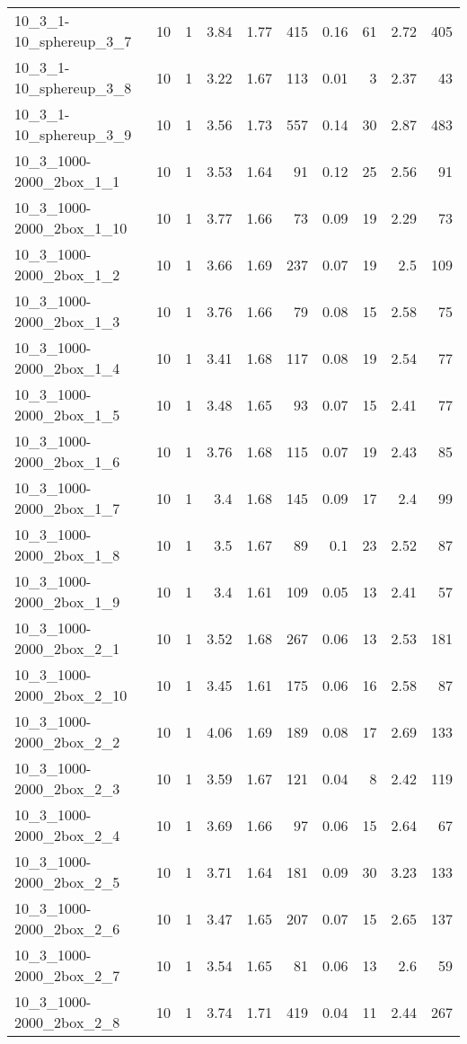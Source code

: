 \begin{center}
\begin{scriptsize}
\begin{longtable}{lrrrrrrrrr}
10\_3\_1-10\_sphereup\_3\_7 & 10 & 1 & 3.84 & 1.77 & 415 & 0.16 & 61 & 2.72 & 405\\
10\_3\_1-10\_sphereup\_3\_8 & 10 & 1 & 3.22 & 1.67 & 113 & 0.01 & 3 & 2.37 & 43\\
10\_3\_1-10\_sphereup\_3\_9 & 10 & 1 & 3.56 & 1.73 & 557 & 0.14 & 30 & 2.87 & 483\\
10\_3\_1000-2000\_2box\_1\_1 & 10 & 1 & 3.53 & 1.64 & 91 & 0.12 & 25 & 2.56 & 91\\
10\_3\_1000-2000\_2box\_1\_10 & 10 & 1 & 3.77 & 1.66 & 73 & 0.09 & 19 & 2.29 & 73\\
10\_3\_1000-2000\_2box\_1\_2 & 10 & 1 & 3.66 & 1.69 & 237 & 0.07 & 19 & 2.5 & 109\\
10\_3\_1000-2000\_2box\_1\_3 & 10 & 1 & 3.76 & 1.66 & 79 & 0.08 & 15 & 2.58 & 75\\
10\_3\_1000-2000\_2box\_1\_4 & 10 & 1 & 3.41 & 1.68 & 117 & 0.08 & 19 & 2.54 & 77\\
10\_3\_1000-2000\_2box\_1\_5 & 10 & 1 & 3.48 & 1.65 & 93 & 0.07 & 15 & 2.41 & 77\\
10\_3\_1000-2000\_2box\_1\_6 & 10 & 1 & 3.76 & 1.68 & 115 & 0.07 & 19 & 2.43 & 85\\
10\_3\_1000-2000\_2box\_1\_7 & 10 & 1 & 3.4 & 1.68 & 145 & 0.09 & 17 & 2.4 & 99\\
10\_3\_1000-2000\_2box\_1\_8 & 10 & 1 & 3.5 & 1.67 & 89 & 0.1 & 23 & 2.52 & 87\\
10\_3\_1000-2000\_2box\_1\_9 & 10 & 1 & 3.4 & 1.61 & 109 & 0.05 & 13 & 2.41 & 57\\
10\_3\_1000-2000\_2box\_2\_1 & 10 & 1 & 3.52 & 1.68 & 267 & 0.06 & 13 & 2.53 & 181\\
10\_3\_1000-2000\_2box\_2\_10 & 10 & 1 & 3.45 & 1.61 & 175 & 0.06 & 16 & 2.58 & 87\\
10\_3\_1000-2000\_2box\_2\_2 & 10 & 1 & 4.06 & 1.69 & 189 & 0.08 & 17 & 2.69 & 133\\
10\_3\_1000-2000\_2box\_2\_3 & 10 & 1 & 3.59 & 1.67 & 121 & 0.04 & 8 & 2.42 & 119\\
10\_3\_1000-2000\_2box\_2\_4 & 10 & 1 & 3.69 & 1.66 & 97 & 0.06 & 15 & 2.64 & 67\\
10\_3\_1000-2000\_2box\_2\_5 & 10 & 1 & 3.71 & 1.64 & 181 & 0.09 & 30 & 3.23 & 133\\
10\_3\_1000-2000\_2box\_2\_6 & 10 & 1 & 3.47 & 1.65 & 207 & 0.07 & 15 & 2.65 & 137\\
10\_3\_1000-2000\_2box\_2\_7 & 10 & 1 & 3.54 & 1.65 & 81 & 0.06 & 13 & 2.6 & 59\\
10\_3\_1000-2000\_2box\_2\_8 & 10 & 1 & 3.74 & 1.71 & 419 & 0.04 & 11 & 2.44 & 267\\

\end{longtable}
\end{scriptsize}
\end{center}
